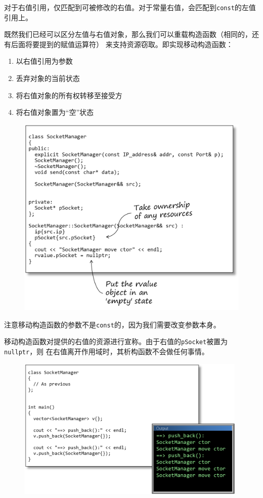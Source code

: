 \documentclass[12pt]{article}
\begin{document}
\noindent{}对于右值引用，仅匹配到可被修改的右值。对于常量右值，会匹配到\texttt{const}的左值引用上。

\indent{}既然我们已经可以区分左值与右值对象，那么我们可以重载构造函数（相同的，还有后面将要提到的赋值运算符）
来支持资源窃取。即实现移动构造函数：

\begin{enumerate}
    \item 以右值引用为参数
    \item 丢弃对象的当前状态
    \item 将右值对象的所有权转移至接受方
    \item 将右值对象置为“空”状态
\end{enumerate}

\begin{figure}[h]
\centering
\includegraphics[width=12cm]{./imgs/image.K672S0.png}
\end{figure}

\noindent{}注意移动构造函数的参数不是\texttt{const}的，因为我们需要改变参数本身。

\indent{}移动构造函数对提供的右值的资源进行宣称。由于右值的\texttt{pSocket}被置为\texttt{nullptr}，则
在右值离开作用域时，其析构函数不会做任何事情。

\begin{figure}[h]
\centering
\includegraphics[width=11cm]{./imgs/image.ZZAZS0.png}
\end{figure}
\end{document}
